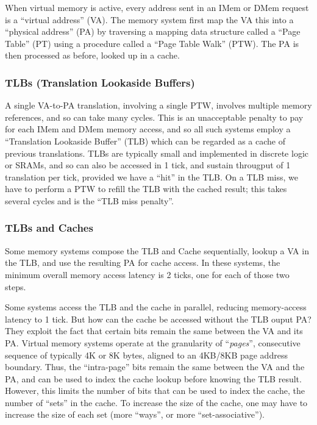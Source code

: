 
When virtual memory is active, every address sent in an IMem or DMem
request is a ``virtual address'' (VA).  The memory system first map
the VA this into a ``physical address'' (PA) by traversing a mapping
data structure called a ``Page Table'' (PT) using a procedure called a
``Page Table Walk'' (PTW).  The PA is then processed as before, {\ie}
looked up in a cache.


\subsubsection{TLBs (Translation Lookaside Buffers)}


A single VA-to-PA translation, involving a single PTW, involves
multiple memory references, and so can take many cycles.  This is an
unacceptable penalty to pay for each IMem and DMem memory access, and
so all such systems employ a ``Translation Lookaside Buffer'' (TLB)
which can be regarded as a cache of previous translations.  TLBs are
typically small and implemented in discrete logic or SRAMs, and so can
also be accessed in 1 tick, and sustain througput of 1 translation per
tick, provided we have a ``hit'' in the TLB.  On a TLB miss, we have
to perform a PTW to refill the TLB with the cached result; this takes
several cycles and is the ``TLB miss penalty''.


\subsubsection{TLBs and Caches}

Some memory systems compose the TLB and Cache sequentially, {\ie}
lookup a VA in the TLB, and use the resulting PA for cache access.
In these systems, the minimum overall memory access latency is 2 ticks,
one for each of those two steps.


Some systems access the TLB and the cache in parallel, reducing
memory-access latency to 1 tick.  But how can the cache be accessed
without the TLB ouput PA?  They exploit the fact that certain bits
remain the same between the VA and its PA.  Virtual memory systems
operate at the granularity of ``\emph{pages}'', consecutive sequence
of typically 4K or 8K bytes, aligned to an 4KB/8KB page address
boundary.  Thus, the ``intra-page'' bits remain the same between the
VA and the PA, and can be used to index the cache lookup before
knowing the TLB result.  However, this limits the number of bits that
can be used to index the cache, {\ie} the number of ``sets'' in the
cache.  To increase the size of the cache, one may have to increase
the size of each set (more ``ways'', or more ``set-associative'').


